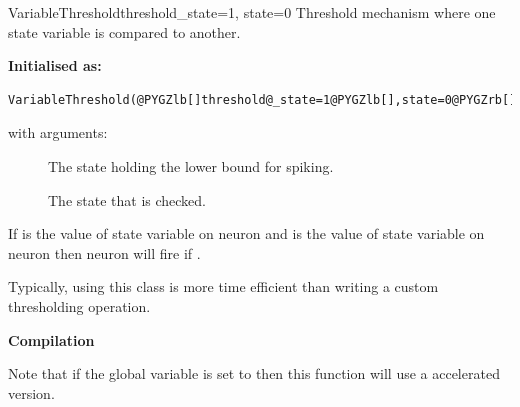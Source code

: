 \documentclass[letterpaper,10pt,english]{manual}
\begin{document}
\hypertarget{brian.VariableThreshold}{}\begin{classdesc}{VariableThreshold}{threshold\_state=1, state=0}
Threshold mechanism where one state variable is compared to another.

\textbf{Initialised as:}

\begin{Verbatim}[commandchars=@\[\]]
VariableThreshold(@PYGZlb[]threshold@_state=1@PYGZlb[],state=0@PYGZrb[]@PYGZrb[])
\end{Verbatim}

with arguments:
\begin{description}
\item[] \leavevmode
The state holding the lower bound for spiking.

\item[] \leavevmode
The state that is checked.

\end{description}

If  is the value of state variable  on neuron
 and  is the value of state variable  on neuron
 then neuron  will fire if .

Typically, using this class is more time efficient than writing
a custom thresholding operation.

\textbf{Compilation}

Note that if the global variable  is set to 
then this function will use a  accelerated version.
\end{classdesc}
\end{document}
